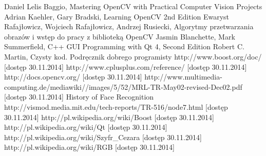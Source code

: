 \documentclass[eng,printmode]{mgr}
\begin{document}
\begin{thebibliography}{18}

 Daniel Lelis Baggio, Mastering OpenCV with Practical Computer Vision Projects
 Adrian Kaehler, Gary Bradski, Learning OpenCV 2nd Edition
  Ewaryst Rafajłowicz, Wojciech Rafajłowicz, Andrzej Rusiecki, Algorytmy przetwarzania obrazów i wstęp do pracy z biblioteką OpenCV
 Jasmin Blanchette, Mark Summerfield, C++ GUI Programming with Qt 4, Second Edition
 Robert C. Martin, Czysty kod. Podręcznik dobrego programisty
 http://www.boost.org/doc/ [dostęp 30.11.2014]
 http://www.cplusplus.com/reference/ [dostęp 30.11.2014]
 http://docs.opencv.org/ [dostęp 30.11.2014]
 http://www.multimedia-computing.de/mediawiki//images/5/52/MRL-TR-May02-revised-Dec02.pdf [dostęp 30.11.2014]
 History of Face Recognition http://vismod.media.mit.edu/tech-reports/TR-516/node7.html [dostęp 30.11.2014]
 http://pl.wikipedia.org/wiki/Boost [dostęp 30.11.2014]
 http://pl.wikipedia.org/wiki/Qt [dostęp 30.11.2014]
 http://pl.wikipedia.org/wiki/Szyfr\_Cezara [dostęp 30.11.2014]
 http://pl.wikipedia.org/wiki/RGB [dostęp 30.11.2014]
\end{thebibliography}

 \listoffigures
\end{document}
